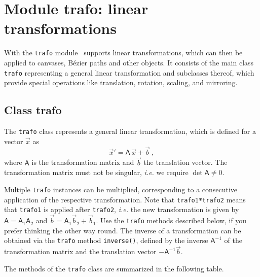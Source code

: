 \chapter{Module trafo: linear transformations}

\label{trafo}

With the  \verb|trafo| module \PyX\ supports linear transformations, which can 
then be applied to canvases,  B\'ezier paths and other objects. It consists
of the main class \verb|trafo| representing a general linear
transformation and subclasses thereof, which provide special operations
like translation, rotation, scaling, and mirroring.

\section{Class trafo}

The \verb|trafo| class represents a general linear
transformation, which is defined for a vector $\vec{x}$ as
\begin{displaymath}
  \vec{x}' = \mathsf{A}\, \vec{x} + \vec{b}\ ,
\end{displaymath}
where $\mathsf{A}$ is the transformation matrix and $\vec{b}$ the
translation vector. The transformation matrix must not be singular,
\textit{i.e.} we require $\det \mathsf{A} \ne 0$.



Multiple \verb|trafo| instances can be multiplied, corresponding to a
consecutive application of the respective transformation. Note that
\verb|trafo1*trafo2| means that \verb|trafo1| is applied after
\verb|trafo2|, \textit{i.e.} the new transformation is given 
by $\mathsf{A} = \mathsf{A}_1 \mathsf{A}_2$ and
$\vec{b} = \mathsf{A}_1 \vec{b}_2 + \vec{b}_1$.  Use the \verb|trafo|
methods described below, if you prefer thinking the other way round.
The inverse of a transformation can be obtained via the \verb|trafo|
method \verb|inverse()|, defined by the inverse $\mathsf{A}^{-1}$ of
the transformation matrix and the translation vector
$-\mathsf{A}^{-1}\vec{b}$.

The methods of the \verb|trafo| class are summarized in the following
table.

